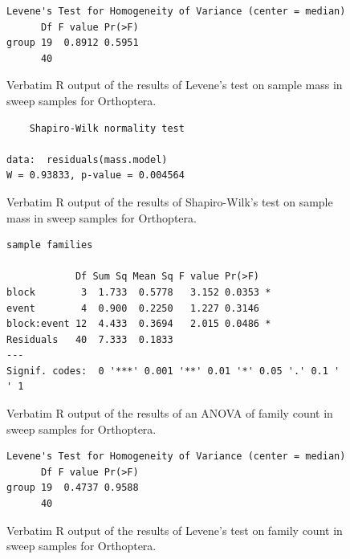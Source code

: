 \documentclass[10pt,letterpaper,twocolumn]{article}
\begin{document}
\begin{figure}[h]
	\lstset{numbers=left}
	\lstset{xleftmargin=5mm,framexleftmargin=5mm}
	\begin{lstlisting}
Levene's Test for Homogeneity of Variance (center = median)
      Df F value Pr(>F)
group 19  0.8912 0.5951
      40               
	\end{lstlisting}
	\caption{Verbatim R output of the results of Levene's test on sample mass in sweep samples for Orthoptera.}
	\label{fig:sweep_orthoptera_mass_levene}
	\smallskip
	\nointerlineskip
	\hrulefill
\end{figure}

\begin{figure}[h]
	\lstset{numbers=left}
	\lstset{xleftmargin=5mm,framexleftmargin=5mm}
	\begin{lstlisting}
	Shapiro-Wilk normality test

data:  residuals(mass.model)
W = 0.93833, p-value = 0.004564
	\end{lstlisting}
	\caption{Verbatim R output of the results of Shapiro-Wilk's test on sample mass in sweep samples for Orthoptera.}
	\label{fig:sweep_orthoptera_mass_shapiro}
	\smallskip
	\nointerlineskip
	\hrulefill
\end{figure}

\begin{figure}[h]
	\lstset{numbers=left}
	\lstset{xleftmargin=5mm,framexleftmargin=5mm}
	\begin{lstlisting}
sample families 

            Df Sum Sq Mean Sq F value Pr(>F)  
block        3  1.733  0.5778   3.152 0.0353 *
event        4  0.900  0.2250   1.227 0.3146  
block:event 12  4.433  0.3694   2.015 0.0486 *
Residuals   40  7.333  0.1833                 
---
Signif. codes:  0 '***' 0.001 '**' 0.01 '*' 0.05 '.' 0.1 ' ' 1
	\end{lstlisting}
	\caption{Verbatim R output of the results of an ANOVA of family count in sweep samples for Orthoptera.}
	\label{fig:sweep_orthoptera_family_anova}
	\smallskip
	\nointerlineskip
	\hrulefill
\end{figure}

\begin{figure}[h]
	\lstset{numbers=left}
	\lstset{xleftmargin=5mm,framexleftmargin=5mm}
	\begin{lstlisting}
Levene's Test for Homogeneity of Variance (center = median)
      Df F value Pr(>F)
group 19  0.4737 0.9588
      40               
	\end{lstlisting}
	\caption{Verbatim R output of the results of Levene's test on family count in sweep samples for Orthoptera.}
	\label{fig:sweep_orthoptera_family_levene}
	\smallskip
	\nointerlineskip
	\hrulefill
\end{figure}
\end{document}
